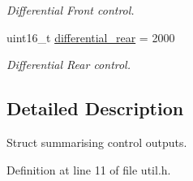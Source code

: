 \begin{DoxyCompactItemize}
\begin{DoxyCompactList}\small\item\em Differential Front control. \end{DoxyCompactList}\item 
uint16\+\_\+t \hyperlink{structSPMB_1_1util_1_1control_a07e85f5ccd5c59ce1d7de56c82b089f2}{differential\+\_\+rear} = 2000\hypertarget{structSPMB_1_1util_1_1control_a07e85f5ccd5c59ce1d7de56c82b089f2}{}\label{structSPMB_1_1util_1_1control_a07e85f5ccd5c59ce1d7de56c82b089f2}

\begin{DoxyCompactList}\small\item\em Differential Rear control. \end{DoxyCompactList}\end{DoxyCompactItemize}


\subsection{Detailed Description}
Struct summarising control outputs. 

Definition at line 11 of file util.\+h.

